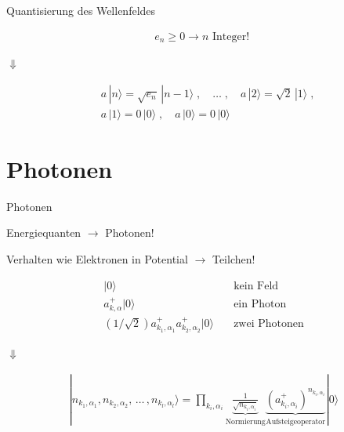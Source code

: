 \documentclass{beamer}
\begin{document}
\begin{frame}[t]{Quantisierung des Wellenfeldes}
	\vspace*{-0.5cm}
	\begin{center}
		\begin{minipage}{0.35\textwidth}
			\begin{align*}
			e_n \geq 0 \rightarrow n \text{ Integer! }
			\end{align*}
		\end{minipage}
		
		\vspace*{0.5cm}
		$\Downarrow$
		
		\begin{minipage}{0.35\textwidth}
			\begin{align*}
			& a\,|n\rangle = \sqrt{e_n}\,|n-1\rangle  \;, \quad \hdots \; , \quad a\,|2\rangle = \sqrt{2}\,|1\rangle \; , \\
			 & a\,|1\rangle = 0\,|0\rangle \;, \quad a\,|0\rangle = 0\,|0\rangle
			\end{align*}
		\end{minipage}
	\end{center}
\end{frame}


\section{Photonen}
\begin{frame}[t]{Photonen}
	\vspace*{-0.5cm}
	\begin{center}
		Energiequanten $\rightarrow$ Photonen!
		
		Verhalten wie Elektronen in Potential $\rightarrow$ Teilchen!
		
		\begin{minipage}{0.35\textwidth}
			\begin{align*}
			|0\rangle & \quad \text{kein Feld}\\
			a^+_{k,\alpha}|0\rangle & \quad \text{ein Photon}\\
			\left(1/\sqrt{2}\right)a^+_{k_1,\alpha_1}a^+_{k_2,\alpha_2}|0\rangle & \quad \text{zwei Photonen}
			\end{align*}
		\end{minipage}
		
		\vspace*{0.5cm}
		$\Downarrow$
		
		\begin{minipage}{0.35\textwidth}
			\begin{align*}
			|n_{k_1,\alpha_1}, n_{k_2,\alpha_2}, \, \hdots \, , n_{k_l,\alpha_l}\rangle =
			\prod_{k_i,\alpha_i}\underbrace{\frac{1}{\sqrt{n_{k_i,\alpha_i}}}}_{\text{Normierung}} \underbrace{\left(a^+_{k_i,\alpha_i}\right)^{n_{k_i,\alpha_i}}}_{\text{Aufsteigeoperator}} |0\rangle
			\end{align*}
		\end{minipage}
	\end{center}
\end{frame}
\end{document}
